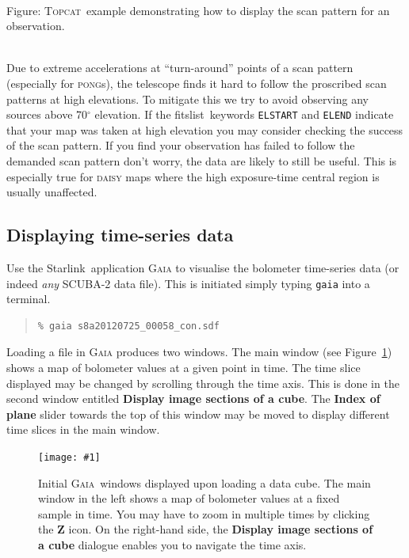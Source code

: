 \documentclass[twoside,11pt]{article}
\newcommand{\htmladdnormallink}[2]{#1}
\newcommand{\htmladdimg}[1]{}
\newcommand{\htmlref}[2]{#1}
\newcommand{\latexhtml}[2]{#1}
\newcommand{\xref}[3]{#1}
\newcommand{\xlabel}[1]{}
\renewcommand{\_}{\texttt{\symbol{95}}}
\newenvironment{myquote}{
   \color{MidnightBlue}\begin{quote}\begin{small}}{
   \end{small}\end{quote}
}
\newcommand{\starlink}{\htmladdnormallink{Starlink}{http://starlink.jach.hawaii.edu}}
\newcommand{\gaia}{\xref{\textsc{Gaia}}{sun214}{}}
\newcommand{\topcat}{\htmladdnormallink{\textsc{Topcat}}{http://www.starlink.ac.uk/topcat}}
\newcommand{\task}[1]{\textsf{#1}}
\newcommand{\param}[1]{\texttt{#1}}
\newcommand{\gaiathing}[1]{\textbf{\textsf{#1}}}
\newcommand{\fitslist}{\xref{\task{fitslist}}{sun95}{FITSLIST}}
\newcommand{\myfig}[6]{
  \begin{figure}#2
    \centering\texttt{[image: \#1]}
    \typeout{#1 inserted on page \arabic{page}}
    \caption[#5]{\label{#4}\small #6}
  \end{figure}
}
\newcommand{\myfig}[6]{
    \label{#4} \htmladdimg{#1.png}\\
    \\
    Figure: #6\\
  }
\newcommand{\cref}[3]{\latexhtml{#1~\ref{#2}}{\htmlref{#3}{#2}}}
\renewenvironment{myquote}{
      \begin{quote}\begin{small}}{
      \end{small}\end{quote}
   }
\begin{document}
\begin{htmlonly}
 \label{fig:topcat} \htmladdimg{sc21_topcat_example.png}
 \\
 Figure: \topcat\ example demonstrating how to display the scan
 pattern for an observation.\\ \\
\end{htmlonly}

Due to extreme accelerations at ``turn-around'' points of a scan
pattern (especially for \textsc{pong}s), the telescope finds it hard
to follow the proscribed scan patterns at high elevations. To mitigate
this we try to avoid observing any sources above 70$^\circ$ elevation.
If the \fitslist\ keywords \param{ELSTART} and \param{ELEND}
indicate that your map was taken at high elevation you may consider
checking the success of the scan pattern. If you find your observation
has failed to follow the demanded scan pattern don't worry, the data are
likely to still be useful. This is especially true for \textsc{daisy}
maps where the high exposure-time central region is usually
unaffected.

\subsection{\xlabel{display_cube}Displaying time-series data}
\label{sec:gaiacube}

Use the \starlink\ application \textsc{Gaia} to visualise the bolometer
time-series data (or indeed \emph{any} SCUBA-2 data file). This is
initiated simply typing \texttt{gaia} into a terminal.

\begin{myquote}
\begin{verbatim}
% gaia s8a20120725_00058_con.sdf
\end{verbatim}
\end{myquote}

Loading a file in \textsc{Gaia} produces two windows. The main window (see
\cref{Figure}{fig:gaia_main}{upper graphic}) shows a
map of bolometer values at a given point in time. The time slice
displayed may be changed by scrolling through the time axis. This is
done in the second window entitled \gaiathing{Display image sections of
a cube}. The \gaiathing{Index of plane} slider towards the top of this
window may be moved to display different time slices in the main
window.

\myfig{sc21_gaia1}{[b]}{width=\linewidth}{fig:gaia_main}{
  Raw data displayed in the main \gaia\ window}{
  Initial \gaia\ windows displayed upon loading a data cube.
  The main window in the left shows a map of bolometer values at a fixed
  sample in time. You may have to zoom in multiple times by clicking the
  \gaiathing{Z} icon. On the right-hand side, the
  \gaiathing{Display image sections of a cube}
  dialogue enables you to navigate the time axis.
}
\end{document}
